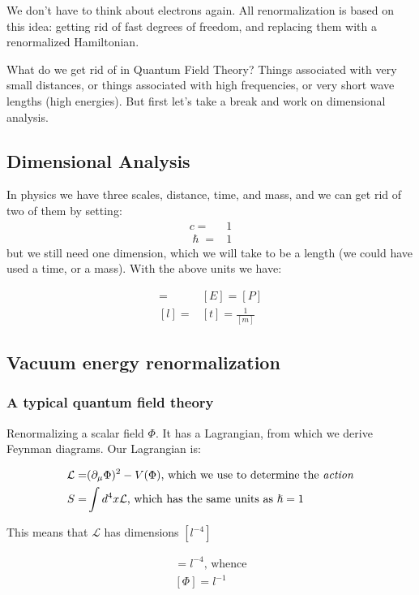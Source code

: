 \documentclass[]{article}
\begin{document}
We don't have to think about electrons again. All renormalization is based on this idea: getting rid of fast degrees of freedom, and replacing them with a renormalized Hamiltonian. 

What do we get rid of in Quantum Field Theory? Things associated with very small distances, or things associated with high frequencies, or very short wave lengths (high energies). But first let's take a break and work on dimensional analysis.

\subsection{Dimensional Analysis}

In physics we have three scales, distance, time, and mass, and we can get rid of two of them by setting:
\begin{align*}
	c=&1\\
	\hslash=& 1
\end{align*} 
but we still need one dimension, which we will take to be a length (we could have used a time, or a mass). With the above units we have: 

\begin{align*}
	[m] =& [E]	= [P]\\
	[l] =& [t]	= \frac{1}{[m]}
\end{align*}

\subsection{Vacuum energy renormalization}
\subsubsection{A typical quantum field theory}

Renormalizing a scalar field $\Phi$. It has a Lagrangian, from which we derive Feynman diagrams. Our Lagrangian is:

\begin{align*}
	\mathcal{L} =& (\partial_\mu \Phi)^2 - V(\Phi) \text{, which we use to determine the \emph{action}}\\
	S =& \int d^4 x \mathcal{L} \text{, which has the same units as $\hslash=1$}
\end{align*}

This means that $\mathcal{L}$ has dimensions $[l^{-4}]$

\begin{align*}
	[(\frac{\partial \Phi}{\partial x})^2]=l^{-4} \text{, whence}\\
	[\Phi] = l^{-1}
\end{align*}
\end{document}
